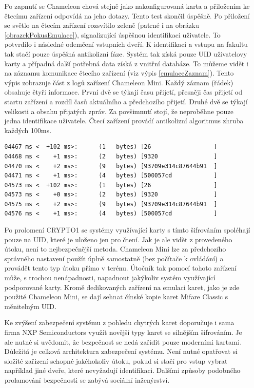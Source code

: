 Po zapnutí se Chameleon chová stejně jako nakonfigurovaná karta a přiložením ke čtecímu zařízení odpovídá na jeho dotazy. Tento test skončil úspěšně. Po přiložení se světlo na čtecím zařízení rozsvítilo zeleně (patrné i na obrázku \ref{obrazekPokusEmulace}), signalizující úspěšnou identifikaci uživatele. To potvrdilo i následné odemčení vstupních dveří. K identifikaci a vstupu na fakultu tak stačí pouze úspěšná antikolizní fáze. Systém tak získá pouze UID uživatelovy karty a případná další potřebná data získá z vnitřní databáze. To můžeme vidět i na záznamu komunikace čtecího zařízení (viz výpis \ref{emulaceZaznam}). Tento výpis zobrazuje část z logů zařízení Chameleon Mini. Každý záznam (řádek) obsahuje čtyři informace. První dvě se týkají času přijetí, přesněji čas přijetí od startu zařízení a rozdíl časů aktuálního a předchozího přijetí. Druhé dvě se týkají velikosti a obsahu přijatých zpráv. Za povšimnutí stojí, že neproběhne pouze jedna identifikace uživatele. Čtecí zařízení provádí antikolizní algoritmus zhruba každých 100ms. 
\par
\begin{lstlisting}[caption=Část komunikace čtecího zařízení, label={emulaceZaznam}]
04467 ms <  +102 ms>:      (1   bytes) [26                  ]
04468 ms <    +1 ms>:      (2   bytes) [9320                ]
04470 ms <    +2 ms>:      (9   bytes) [93709e314c87644b91  ]
04471 ms <    +1 ms>:      (4   bytes) [500057cd            ]
04573 ms <  +102 ms>:      (1   bytes) [26                  ]
04573 ms <    +0 ms>:      (2   bytes) [9320                ]
04575 ms <    +2 ms>:      (9   bytes) [93709e314c87644b91  ]
04576 ms <    +1 ms>:      (4   bytes) [500057cd            ]
\end{lstlisting}

Po prolomení CRYPTO1 se systémy využívající karty s tímto šifrováním spoléhají pouze na UID, které je uloženo jen pro čtení. Jak je ale vidět z provedeného útoku, není to nejbezpečnější metoda. Chameleon Mini lze za předchozího správného nastavení použít úplně samostatně (bez počítače k ovládání) a provádět tento typ útoku přímo v terénu. Útočník tak pomocí tohoto zařízení může, s trochou nenápadnosti, napadnout jakýkoliv systém využívající podporované karty. Kromě dedikovaných zařízení na emulaci karet, jako je zde použité Chameleon Mini, se dají sehnat čínské kopie karet Mifare Classic s měnitelným UID.  \par
Ke zvýšení zabezpečení systému z pohledu chytrých karet doporučuje i sama firma NXP Semiconductors využít novější typy karet se silnějším šifrováním. Je ale nutné si uvědomit, že bezpečnost se nedá zařídit pouze moderními kartami. Důležitá je celková architektura zabezpečení systému. Není nutné opatřovat si složité zařízení schopné jakéhokoliv útoku, pokud si stačí pro vstup vybrat například jiné dveře, které nevyžadují identifikaci. Dalšími způsoby podobného prolamování bezpečnosti se zabývá sociální inženýrství.\par

